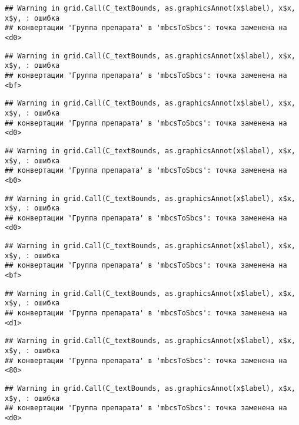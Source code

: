 \documentclass[
]{article}
\begin{document}
\begin{verbatim}
## Warning in grid.Call(C_textBounds, as.graphicsAnnot(x$label), x$x, x$y, : ошибка
## конвертации 'Группа препарата' в 'mbcsToSbcs': точка заменена на <d0>
\end{verbatim}

\begin{verbatim}
## Warning in grid.Call(C_textBounds, as.graphicsAnnot(x$label), x$x, x$y, : ошибка
## конвертации 'Группа препарата' в 'mbcsToSbcs': точка заменена на <bf>
\end{verbatim}

\begin{verbatim}
## Warning in grid.Call(C_textBounds, as.graphicsAnnot(x$label), x$x, x$y, : ошибка
## конвертации 'Группа препарата' в 'mbcsToSbcs': точка заменена на <d0>
\end{verbatim}

\begin{verbatim}
## Warning in grid.Call(C_textBounds, as.graphicsAnnot(x$label), x$x, x$y, : ошибка
## конвертации 'Группа препарата' в 'mbcsToSbcs': точка заменена на <b0>
\end{verbatim}

\begin{verbatim}
## Warning in grid.Call(C_textBounds, as.graphicsAnnot(x$label), x$x, x$y, : ошибка
## конвертации 'Группа препарата' в 'mbcsToSbcs': точка заменена на <d0>
\end{verbatim}

\begin{verbatim}
## Warning in grid.Call(C_textBounds, as.graphicsAnnot(x$label), x$x, x$y, : ошибка
## конвертации 'Группа препарата' в 'mbcsToSbcs': точка заменена на <bf>
\end{verbatim}

\begin{verbatim}
## Warning in grid.Call(C_textBounds, as.graphicsAnnot(x$label), x$x, x$y, : ошибка
## конвертации 'Группа препарата' в 'mbcsToSbcs': точка заменена на <d1>
\end{verbatim}

\begin{verbatim}
## Warning in grid.Call(C_textBounds, as.graphicsAnnot(x$label), x$x, x$y, : ошибка
## конвертации 'Группа препарата' в 'mbcsToSbcs': точка заменена на <80>
\end{verbatim}

\begin{verbatim}
## Warning in grid.Call(C_textBounds, as.graphicsAnnot(x$label), x$x, x$y, : ошибка
## конвертации 'Группа препарата' в 'mbcsToSbcs': точка заменена на <d0>
\end{verbatim}
\end{document}
